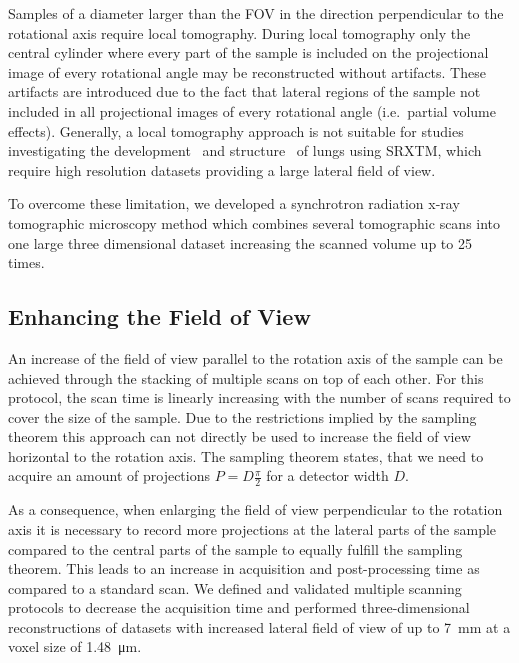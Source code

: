 Samples of a diameter larger than the FOV in the direction perpendicular to the rotational axis require local tomography. During local tomography only the central cylinder where every part of the sample is included on the projectional image of every rotational angle may be reconstructed without artifacts. These artifacts are introduced due to the fact that lateral regions of the sample not included in all projectional images of every rotational angle (i.e.\ partial volume effects). Generally, a local tomography approach is not suitable for studies investigating the development~\cite{Schittny2008,Mund2008} and structure~\cite{Tsuda2008} of lungs using SRXTM, which require high resolution datasets providing a large lateral field of view.

To overcome these limitation, we developed a synchrotron radiation x-ray tomographic microscopy method which combines several tomographic scans into one large three dimensional dataset increasing the scanned volume up to 25 times.

\subsection{Enhancing the Field of View}%
\label{subsec:enhancing the field of view}%
An increase of the field of view parallel to the rotation axis of the sample can be achieved through the stacking of multiple scans on top of each other. For this protocol, the scan time is linearly increasing with the number of scans required to cover the size of the sample. Due to the restrictions implied by the sampling theorem this approach can not directly be used to increase the field of view horizontal to the rotation axis. The sampling theorem states, that we need to acquire an amount of projections $P=D\frac{\pi}{2}$ for a detector width $D$.

As a consequence, when enlarging the field of view perpendicular to the rotation axis it is necessary to record more projections at the lateral parts of the sample compared to the central parts of the sample to equally fulfill the sampling theorem. This leads to an increase in acquisition and post-processing time as compared to a standard scan. We defined and validated multiple scanning protocols to decrease the acquisition time and performed three-dimensional reconstructions of datasets with increased lateral field of view of up to \SI{7}{\milli\meter} at a voxel size of \SI{1.48}{\micro\meter}.